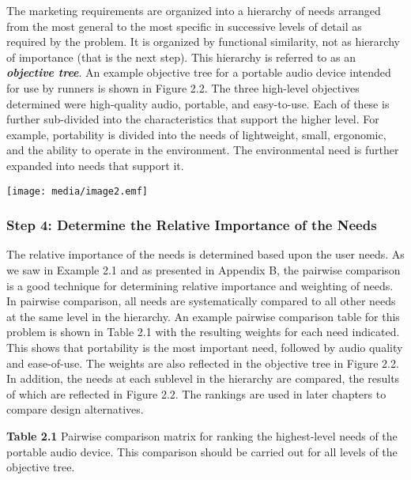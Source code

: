The marketing requirements are organized into a hierarchy of needs
arranged from the most general to the most specific in successive levels
of detail as required by the problem. It is organized by functional
similarity, not as hierarchy of importance (that is the next step). This
hierarchy is referred to as an \emph{\textbf{objective tree}}. An
example objective tree for a portable audio device intended for use by
runners is shown in Figure 2.2. The three high-level objectives
determined were high-quality audio, portable, and easy-to-use. Each of
these is further sub-divided into the characteristics that support the
higher level. For example, portability is divided into the needs of
lightweight, small, ergonomic, and the ability to operate in the
environment. The environmental need is further expanded into needs that
support it.

\texttt{[image: media/image2.emf]}

\subsubsection*{Step 4: Determine the Relative Importance of the
Needs}\label{step-4-determine-the-relative-importance-of-the-needs}

The relative importance of the needs is determined based upon the user
needs. As we saw in Example 2.1 and as presented in Appendix B, the
pairwise comparison is a good technique for determining relative
importance and weighting of needs. In pairwise comparison, all needs are
systematically compared to all other needs at the same level in the
hierarchy. An example pairwise comparison table for this problem is
shown in Table 2.1 with the resulting weights for each need indicated.
This shows that portability is the most important need, followed by
audio quality and ease-of-use. The weights are also reflected in the
objective tree in Figure 2.2. In addition, the needs at each sublevel in
the hierarchy are compared, the results of which are reflected in Figure
2.2. The rankings are used in later chapters to compare design
alternatives.

\textbf{Table 2.1} Pairwise comparison matrix for ranking the
highest-level needs of the portable audio device. This comparison should
be carried out for all levels of the objective tree.

